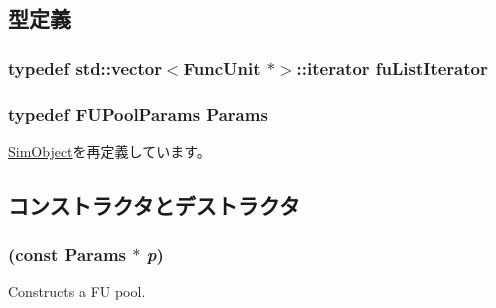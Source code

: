 \subsection{型定義}
\hypertarget{classFUPool_a3e016eb9543b88309e1309f75f1c388c}{
\subsubsection[{fuListIterator}]{\setlength{\rightskip}{0pt plus 5cm}typedef {\bf std::vector}$<${\bf FuncUnit} $\ast$$>$::iterator {\bf fuListIterator}}}
\label{classFUPool_a3e016eb9543b88309e1309f75f1c388c}
\hypertarget{classFUPool_a9d3633c4c2cf6388d3099abc3b5c8eb2}{
\subsubsection[{Params}]{\setlength{\rightskip}{0pt plus 5cm}typedef FUPoolParams {\bf Params}}}
\label{classFUPool_a9d3633c4c2cf6388d3099abc3b5c8eb2}


\hyperlink{classSimObject_a0f0761d2db586a23bb2a2880b8f387bb}{SimObject}を再定義しています。

\subsection{コンストラクタとデストラクタ}
\hypertarget{classFUPool_aba08c56e41f112e5044ca90734506bef}{
\subsubsection[{FUPool}]{ (const {\bf Params} $\ast$ {\em p})}}
\label{classFUPool_aba08c56e41f112e5044ca90734506bef}
Constructs a FU pool. 


